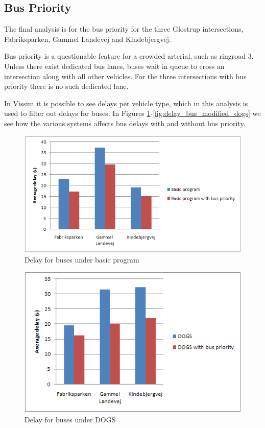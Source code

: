 \subsection{Bus Priority}
The final analysis is for the bus priority for the three Glostrup intersections, Fabriksparken, Gammel Landevej and Kindebjergvej.

Bus priority is a questionable feature for a crowded arterial, such as ringroad 3. Unless there exist dedicated bus lanes, buses wait in queue to cross an intersection along with all other vehicles. For the three intersections with bus priority there is no such dedicated lane.

In Vissim it is possible to see delays per vehicle type, which in this analysis is used to filter out delays for buses.
In Figures \ref{fig:delay_bus_basic}-\ref{fig:delay_bus_modified_dogs} we see how the various systems affects bus delays with and without bus priority.

\begin{figure}[ht]
\centering
\includegraphics[scale=0.30]{delay_bus_basic.png}
\caption{Delay for buses under basic program}
\label{fig:delay_bus_basic}
\end{figure}

\begin{figure}[ht]
\centering
\includegraphics[scale=0.30]{delay_bus_dogs.png}
\caption{Delay for buses under DOGS}
\label{fig:delay_bus_dogs}
\end{figure}

